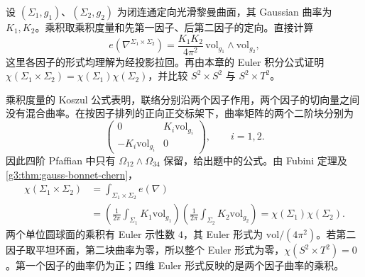 \begin{exercise}\label{g3:ex:euler-product-surfaces}
	设 \((\Sigma_1,g_1)\)、\((\Sigma_2,g_2)\) 为闭连通定向光滑黎曼曲面，其 Gaussian 曲率为 \(K_1,K_2\)。乘积取乘积度量和先第一因子、后第二因子的定向。直接计算
	\[
		e(\nabla^{\Sigma_1\times\Sigma_2})
		=\frac{K_1K_2}{4\pi^2}\,\mathrm{vol}_{g_1}\wedge\mathrm{vol}_{g_2},
	\]
	这里各因子的形式均理解为经投影拉回。再由本章的 Euler 积分公式证明 \(\chi(\Sigma_1\times\Sigma_2)=\chi(\Sigma_1)\chi(\Sigma_2)\)，并比较 \(S^2\times S^2\) 与 \(S^2\times T^2\)。
\end{exercise}
\begin{solution}
	乘积度量的 Koszul 公式表明，联络分别沿两个因子作用，两个因子的切向量之间没有混合曲率。在按因子排列的正向正交标架下，曲率矩阵的两个二阶块分别为
	\[
		\begin{pmatrix}0&K_i\mathrm{vol}_{g_i}\\-K_i\mathrm{vol}_{g_i}&0\end{pmatrix},\qquad i=1,2.
	\]
	因此四阶 Pfaffian 中只有 \(\Omega_{12}\wedge\Omega_{34}\) 保留，给出题中的公式。由 Fubini 定理及\cref{g3:thm:gauss-bonnet-chern}，
	\[
		\begin{aligned}
			\chi(\Sigma_1\times\Sigma_2)
			&=\int_{\Sigma_1\times\Sigma_2}e(\nabla)\\
			&=\left(\frac1{2\pi}\int_{\Sigma_1}K_1\mathrm{vol}_{g_1}\right)
			\left(\frac1{2\pi}\int_{\Sigma_2}K_2\mathrm{vol}_{g_2}\right)
			=\chi(\Sigma_1)\chi(\Sigma_2).
		\end{aligned}
	\]
	两个单位圆球面的乘积有 Euler 示性数 \(4\)，其 Euler 形式为 \(\mathrm{vol}/(4\pi^2)\)。若第二因子取平坦环面，第二块曲率为零，所以整个 Euler 形式为零，\(\chi(S^2\times T^2)=0\)。第一个因子的曲率仍为正；四维 Euler 形式反映的是两个因子曲率的乘积。
\end{solution}

